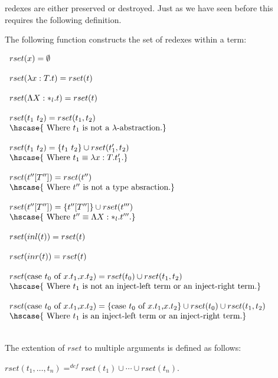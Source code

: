 redexes are either preserved or destroyed. Just as we have seen before
this requires the following definition.
\begin{definition}
  \label{def:rset_ssfp}
  The following function constructs the set of redexes within a term:
  \begin{center}
    \begin{math}
      \begin{array}{lll}    
      rset(x) = \emptyset\\
      & \\
      rset(\lambda x:T.t) = rset(t)\\
      & \\
      rset(\Lambda X:*_l.t) = rset(t)\\
      & \\
      rset(t_1\ t_2) = rset(t_1, t_2)\\      
      \hscase{
        \text{ Where } t_1 \text{ is not a } \lambda \text{-abstraction.}
      }\\
      & \\
      rset(t_1\ t_2) = \{t_1\ t_2\} \cup rset(t'_1, t_2)\\
      \hscase{
        \text{ Where } t_1 \equiv \lambda x:T.t'_1.
      }\\
      & \\
      rset(t''[T'']) = rset(t'')\\
      \hscase{
        \text{ Where } t'' \text{ is not a type absraction.} 
      }\\
      & \\
      rset(t''[T'']) = \{t''[T'']\} \cup rset(t''') \\
      \hscase{
        \text{ Where } t'' \equiv \Lambda X:*_l.t'''.
      }\\
      & \\
      rset(inl(t)) = rset(t)\\
      & \\
      rset(inr(t)) = rset(t)\\
      & \\
      rset(\ccon{t_0}{x}{t_1}{t_2}) = rset(t_0) \cup rset(t_1,t_2)\\
      \hscase{
        \text{ Where } t_1 \text{ is not an inject-left term or an inject-right term.}
      }\\
      & \\
      rset(\ccon{t_0}{x}{t_1}{t_2}) = \{\ccon{t_0}{x}{t_1}{t_2}\} \cup rset(t_0) \cup rset(t_1,t_2)\\
      \hscase{
        \text{ Where } t_1 \text{ is an inject-left term or an inject-right term.}
      }\\
    \end{array}
    \end{math}
  \end{center}
  \ \\
  The extention of $rset$ to multiple arguments is defined as follows:
  \begin{center}
    $rset(t_1, \ldots, t_n) =^{def} rset(t_1) \cup \cdots \cup rset(t_n)$.
  \end{center}
\end{definition}

